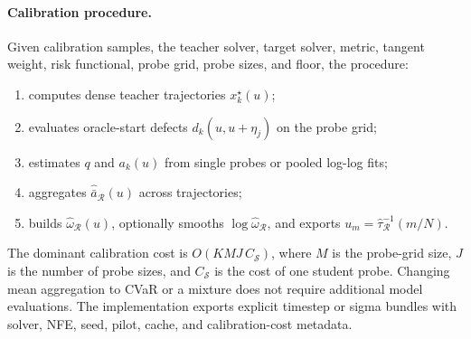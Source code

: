 \paragraph{Calibration procedure.}
Given calibration samples, the teacher solver, target solver, metric, tangent
weight, risk functional, probe grid, probe sizes, and floor, the procedure:
\begin{enumerate}
  \item computes dense teacher trajectories $x_k^\star(u)$;
  \item evaluates oracle-start defects $d_k(u,u+\eta_j)$ on the probe grid;
  \item estimates $q$ and $a_k(u)$ from single probes or pooled log-log fits;
  \item aggregates $\widehat{\bar a}_{\mathcal R}(u)$ across trajectories;
  \item builds $\widehat\omega_{\mathcal R}(u)$, optionally smooths
  $\log\widehat\omega_{\mathcal R}$, and exports
  $u_m=\widehat\tau_{\mathcal R}^{-1}(m/N)$.
\end{enumerate}
The dominant calibration cost is $O(KMJ\,C_{\mathcal S})$, where
$M$ is the probe-grid size, $J$ is the number of probe sizes, and
$C_{\mathcal S}$ is the cost of one student probe. Changing mean aggregation to
CVaR or a mixture does not require additional model evaluations. The
implementation exports explicit timestep or sigma bundles with solver, NFE,
seed, pilot, cache, and calibration-cost metadata.
